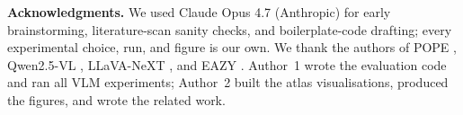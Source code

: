 \documentclass[10pt,twocolumn,letterpaper]{article}
\begin{document}
\noindent
{\bf Acknowledgments.} We used Claude Opus 4.7 (Anthropic) for early
brainstorming, literature-scan sanity checks, and boilerplate-code
drafting; every experimental choice, run, and figure is our own. We
thank the authors of POPE \cite{pope}, Qwen2.5-VL \cite{qwen25vl},
LLaVA-NeXT \cite{llavanext}, and EAZY \cite{eazy}. Author~1 wrote the
evaluation code and ran all VLM experiments; Author~2 built the atlas
visualisations, produced the figures, and wrote the related work.

{\small


}
\end{document}
